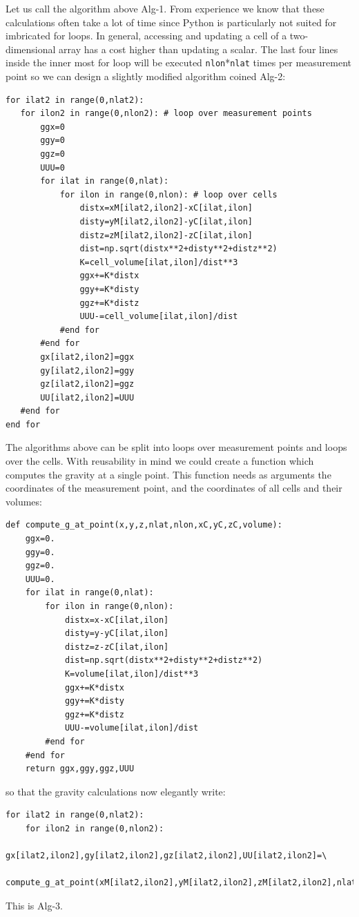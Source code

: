 Let us call the algorithm above Alg-1.
From experience we know that these calculations often take a lot of time since 
Python is particularly not suited for imbricated for loops. 
In general, accessing and updating a cell of a two-dimensional array has a cost
higher than updating a scalar. The last four lines inside the inner most for loop 
will be executed \lstinline{nlon}*\lstinline{nlat} times per measurement point
so we can design a slightly modified algorithm coined Alg-2:
\begin{lstlisting}
for ilat2 in range(0,nlat2):
   for ilon2 in range(0,nlon2): # loop over measurement points
       ggx=0
       ggy=0
       ggz=0
       UUU=0
       for ilat in range(0,nlat):
           for ilon in range(0,nlon): # loop over cells
               distx=xM[ilat2,ilon2]-xC[ilat,ilon]
               disty=yM[ilat2,ilon2]-yC[ilat,ilon]
               distz=zM[ilat2,ilon2]-zC[ilat,ilon]
               dist=np.sqrt(distx**2+disty**2+distz**2)
               K=cell_volume[ilat,ilon]/dist**3
               ggx+=K*distx
               ggy+=K*disty
               ggz+=K*distz
               UUU-=cell_volume[ilat,ilon]/dist
           #end for
       #end for
       gx[ilat2,ilon2]=ggx
       gy[ilat2,ilon2]=ggy
       gz[ilat2,ilon2]=ggz
       UU[ilat2,ilon2]=UUU
   #end for
end for
\end{lstlisting}
The algorithms above can be split into loops over measurement points 
and loops over the cells. With reusability in mind we could create a function which 
computes the gravity at a single point. This function needs as arguments the coordinates
of the measurement point, and the coordinates of all cells and their volumes:
\begin{lstlisting}
def compute_g_at_point(x,y,z,nlat,nlon,xC,yC,zC,volume):
    ggx=0.
    ggy=0.
    ggz=0.
    UUU=0.
    for ilat in range(0,nlat):
        for ilon in range(0,nlon):
            distx=x-xC[ilat,ilon]
            disty=y-yC[ilat,ilon]
            distz=z-zC[ilat,ilon]
            dist=np.sqrt(distx**2+disty**2+distz**2)
            K=volume[ilat,ilon]/dist**3
            ggx+=K*distx
            ggy+=K*disty
            ggz+=K*distz
            UUU-=volume[ilat,ilon]/dist
        #end for
    #end for
    return ggx,ggy,ggz,UUU
\end{lstlisting}
so that the gravity calculations now elegantly write:
\begin{lstlisting}
for ilat2 in range(0,nlat2):
    for ilon2 in range(0,nlon2): 
        gx[ilat2,ilon2],gy[ilat2,ilon2],gz[ilat2,ilon2],UU[ilat2,ilon2]=\
          compute_g_at_point(xM[ilat2,ilon2],yM[ilat2,ilon2],zM[ilat2,ilon2],nlat,nlon,xC,yC,zC,cell_volume)
\end{lstlisting}
This is Alg-3.

